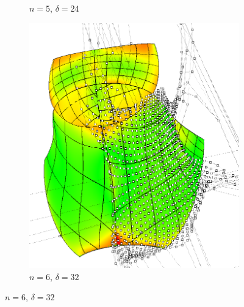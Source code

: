 \documentclass[9pt,academicons]{article}
\begin{document}
\begin{figure}[!ht]
{\begin{subfigure}{.3\textwidth}
      \caption{$n=5$, $\delta=24$}
      \label{fig:cagd86-5-sp}
    \end{subfigure}
    \hfill
    \begin{subfigure}{.3\textwidth}
      \centering
      \includegraphics[width=.9\textwidth]{images/cagd86/spatch1.png}
      \caption{$n=6$, $\delta=32$}
      \label{fig:cagd86-6-sp}
    \end{subfigure}
    \hfill
  }


\end{figure}
\end{document}
